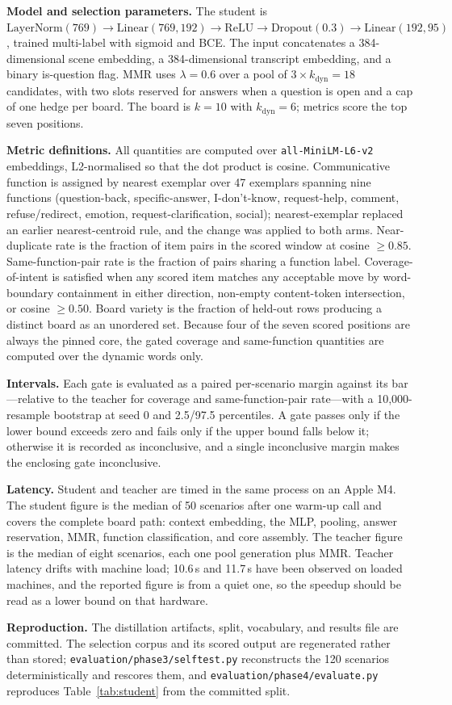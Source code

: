 \textbf{Model and selection parameters.} The student is
$\mathrm{LayerNorm}(769) \rightarrow \mathrm{Linear}(769,192) \rightarrow
\mathrm{ReLU} \rightarrow \mathrm{Dropout}(0.3) \rightarrow
\mathrm{Linear}(192,95)$, trained multi-label with sigmoid and BCE. The input
concatenates a 384-dimensional scene embedding, a 384-dimensional transcript
embedding, and a binary is-question flag. MMR uses $\lambda = 0.6$ over a pool
of $3 \times k_{\mathrm{dyn}} = 18$ candidates, with two slots reserved for
answers when a question is open and a cap of one hedge per board. The board is
$k = 10$ with $k_{\mathrm{dyn}} = 6$; metrics score the top seven positions.

\textbf{Metric definitions.} All quantities are computed over
\texttt{all-MiniLM-L6-v2} embeddings, L2-normalised so that the dot product is
cosine. Communicative function is assigned by nearest exemplar over 47 exemplars
spanning nine functions (question-back, specific-answer, I-don't-know,
request-help, comment, refuse/redirect, emotion, request-clarification, social);
nearest-exemplar replaced an earlier nearest-centroid rule, and the change was
applied to both arms. Near-duplicate rate is the fraction of item pairs in the
scored window at cosine ${\geq}0.85$. Same-function-pair rate is the fraction of
pairs sharing a function label. Coverage-of-intent is satisfied when any scored
item matches any acceptable move by word-boundary containment in either
direction, non-empty content-token intersection, or cosine ${\geq}0.50$. Board
variety is the fraction of held-out rows producing a distinct board as an
unordered set. Because four of the seven scored positions are always the pinned
core, the gated coverage and same-function quantities are computed over the
dynamic words only.

\textbf{Intervals.} Each gate is evaluated as a paired per-scenario margin
against its bar---relative to the teacher for coverage and same-function-pair
rate---with a 10{,}000-resample bootstrap at seed 0 and 2.5/97.5 percentiles. A
gate passes only if the lower bound exceeds zero and fails only if the upper
bound falls below it; otherwise it is recorded as inconclusive, and a single
inconclusive margin makes the enclosing gate inconclusive.

\textbf{Latency.} Student and teacher are timed in the same process on an Apple
M4. The student figure is the median of 50 scenarios after one warm-up call and
covers the complete board path: context embedding, the MLP, pooling, answer
reservation, MMR, function classification, and core assembly. The teacher figure
is the median of eight scenarios, each one pool generation plus MMR. Teacher
latency drifts with machine load; 10.6\,s and 11.7\,s have been observed on
loaded machines, and the reported figure is from a quiet one, so the speedup
should be read as a lower bound on that hardware.

\textbf{Reproduction.} The distillation artifacts, split, vocabulary, and
results file are committed. The selection corpus and its scored output are
regenerated rather than stored; \texttt{evaluation/phase3/selftest.py}
reconstructs the 120 scenarios deterministically and rescores them, and
\texttt{evaluation/phase4/evaluate.py} reproduces Table~\ref{tab:student} from
the committed split.



